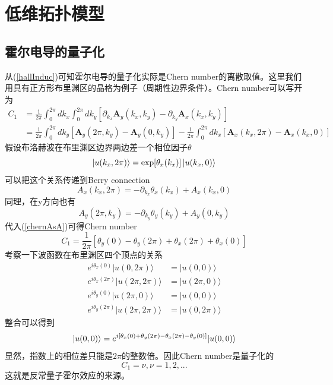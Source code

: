 \chapter{低维拓扑模型}
\section{霍尔电导的量子化}
从(\ref{hallInduc})可知霍尔电导的量子化实际是Chern number的离散取值。这里我们用具有正方形布里渊区的晶格为例子（周期性边界条件）。Chern number可以写开为
\begin{equation}
\begin{aligned}
C_ 1 &= \frac{1}{2 \pi} \int_{0}^{2 \pi} d k_{x} \int_{0}^{2 \pi} d k_{y}\left[\partial_{k_{x}} \mathbf{A}_{y}\left(k_{x}, k_{y}\right)-\partial_{k_{y}} \mathbf{A}_{x}\left(k_{x}, k_{y}\right)\right]\\
&= \frac{1}{2 \pi} \int_{0}^{2 \pi} dk_{y}\left[\mathbf{A}_{y}\left(2 \pi, k_{y}\right)-\mathbf{A}_{y}\left(0, k_{y}\right)\right] -\frac{1}{2 \pi} \int_{0}^{2 \pi} d k_{x}\left[\mathbf{A}_{x}\left(k_{x}, 2 \pi\right)-\mathbf{A}_{x}\left(k_{x}, 0\right)\right] 
\label{chernAsA}
\end{aligned}
\end{equation}
假设布洛赫波在布里渊区边界两边差一个相位因子$\theta$
\begin{equation}
  \ket{u(k_x, 2 \pi)} = \mbox{exp}[\theta_x(k_x)] \ket{u(k_x, 0)}
\end{equation}
可以把这个关系传递到Berry connection
\begin{equation}
  A_x(k_x, 2 \pi) = - \partial_{k_x} \theta_x(k_x) + A_x(k_x, 0)
\end{equation}
同理，在y方向也有
\begin{equation}
A_{y}\left(2 \pi, k_{y}\right)=-\partial_{k_{y}} \theta_{y}\left(k_{y}\right)+A_{y}\left(0, k_{y}\right)
\end{equation}
代入(\ref{chernAsA})可得Chern number
\begin{equation}
  C_1 = \frac{1}{2 \pi} [\theta_y(0) - \theta_y(2 \pi) + \theta_x(2 \pi) + \theta_x(0) ]
\end{equation}
考察一下波函数在布里渊区四个顶点的关系
\begin{equation}
\begin{aligned} e^{i \theta_{x}(0)}|u(0,2 \pi)\rangle &=|u(0,0)\rangle \\ e^{i \theta_{x}(2 \pi)}|u(2 \pi, 2 \pi)\rangle &=|u(2 \pi, 0)\rangle \\ e^{i \theta_{y}(0)}|u(2 \pi, 0)\rangle &=|u(0,0)\rangle \\ e^{i \theta_{y}(2 \pi)}|u(2 \pi, 2 \pi)\rangle &=|u(0,2 \pi)\rangle\end{aligned}
\end{equation}
整合可以得到
\begin{equation}
\ket{u(0,0)}=e^{i\left[\theta_{x}(0)+\theta_{y}(2 \pi)-\theta_{x}(2 \pi)-\theta_{y}(0)\right]}|u(0,0)\rangle
\end{equation}
显然，指数上的相位差只能是$2 \pi$的整数倍。因此Chern number是量子化的
\begin{equation}
  C_1 = \nu, \nu = 1, 2, ...
\end{equation}
这就是反常量子霍尔效应的来源。
